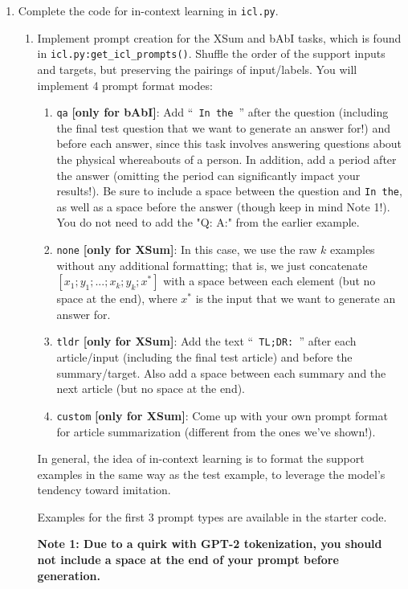 \documentclass[12pt]{article}
\begin{document}
\begin{enumerate}
    \item Complete the code for in-context learning in \texttt{icl.py}.
    \begin{enumerate}
        \item Implement prompt creation for the XSum and bAbI tasks, which is found in \texttt{icl.py:get\_icl\_prompts()}. Shuffle the order of the support inputs and targets, but preserving the pairings of input/labels. You will implement 4 prompt format modes:
        \begin{enumerate}
            \item \texttt{qa} \textbf{[only for bAbI]}: Add ``\texttt{ In the }'' after the question (including the final test question that we want to generate an answer for!) and before each answer, since this task involves answering questions about the physical whereabouts of a person. In addition, add a period after the answer (omitting the period can significantly impact your results!). Be sure to include a space between the question and \texttt{In the}, as well as a space before the answer (though keep in mind Note 1!). You do not need to add the "Q: A:" from the earlier example.
            \item \texttt{none} \textbf{[only for XSum]}: In this case, we use the raw $k$ examples without any additional formatting; that is, we just concatenate $[x_1; y_1; ... ; \allowbreak x_k; y_k; x^*]$ with a space between each element (but no space at the end), where $x^*$ is the input that we want to generate an answer for.
            \item \texttt{tldr} \textbf{[only for XSum]}: Add the text ``\texttt{ TL;DR: }'' after each article/input (including the final test article) and before the summary/target. Also add a space between each summary and the next article (but no space at the end).
            \item \texttt{custom} \textbf{[only for XSum]}: Come up with your own prompt format for article summarization (different from the ones we've shown!).
        \end{enumerate}
        In general, the idea of in-context learning is to format the support examples in the same way as the test example, to leverage the model's tendency toward imitation.

        Examples for the first 3 prompt types are available in the starter code.

        \textbf{Note 1: Due to a quirk with GPT-2 tokenization, you should not include a space at the end of your prompt before generation.}
        

\end{enumerate}
\end{enumerate}
\end{document}

